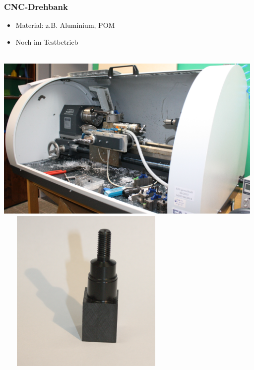 \documentclass[t]{beamer}
\begin{document}
\begin{frame}
    \frametitle{CNC-Drehbank}
    \begin{itemize}
        \item Material: z.B. Aluminium, POM
        \item Noch im Testbetrieb
    \end{itemize}
        \begin{center}
    ~\\
        \includegraphics[height=8cm]{../img/drehbank.png}
        ~~~
        \includegraphics[height=8cm]{../img/drehstueck.png}
    \end{center}
\end{frame}
\end{document}
